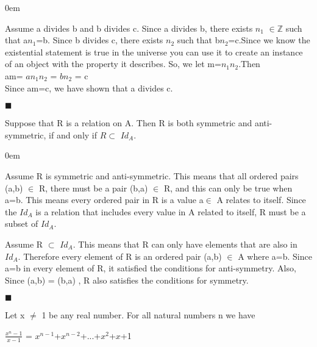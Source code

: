 \documentclass[12pt]{article}
\renewcommand{\qed}{\hfill$\blacksquare$}
\renewenvironment{proof}{\begin{addmargin}[1em]{0em}\begin{newproof}}{\end{newproof}\end{addmargin}\qed}
\newenvironment{theorem}[2][Theorem]{\begin{trivlist}
\item[\hskip \labelsep {\bfseries #1}\hskip \labelsep {\bfseries #2.}]}{\end{trivlist}}
\begin{document}
\begin{proof}[Proof]%
Assume a divides b and b divides c. Since a divides b, there exists $n_1$ $\in \mathbb{Z}$ such that a$n_1$=b. Since b divides c, there exists $n_2$ such that b$n_2$=c.Since we know the existential statement is true in the universe you can use it to create an instance of an object with the property it describes. So, we let m=$n_1n_2$.Then \\

					am= {$an_1n_2$} = {$bn_2$} = c \\

Since am=c, we have shown that a divides c.

\end{proof}

\begin{theorem}{7.11}
Suppose that R is a relation on A. Then R is both symmetric and anti-symmetric, if and only if $R \subset $ $Id_A$.

\end{theorem}


\begin{proof}[Proof]
	
    
    Assume R is symmetric and anti-symmetric. This means that all ordered pairs (a,b) $\in$ R, there must be a pair (b,a) $\in$ R, and this can only be true when a=b. This means every ordered pair in R is a value a$\in$ A relates to itself. Since the $Id_A$ is a relation that includes every value in A related to itself, R must be a subset of $Id_A$. 
	
    
    Assume R $\subset$ $Id_A$. This means that R can only have elements that are also in $Id_A$. Therefore every element of R is an ordered pair (a,b) $\in$ A where a=b. Since a=b in every element of R, it satisfied the conditions for anti-symmetry. Also, Since (a,b) = (b,a) , R also satisfies the conditions for symmetry. 
  

\end{proof}


\begin{theorem}{10.9}

Let x $\neq$ 1 be any real number. For all natural numbers n we have 
	
$\frac{x^{n}-1}{x-1}$ = ${x^{n-1}}$+${x^{n-2}}$+...+$x^{2}$+$x$+1

\end{theorem}
\end{document}
